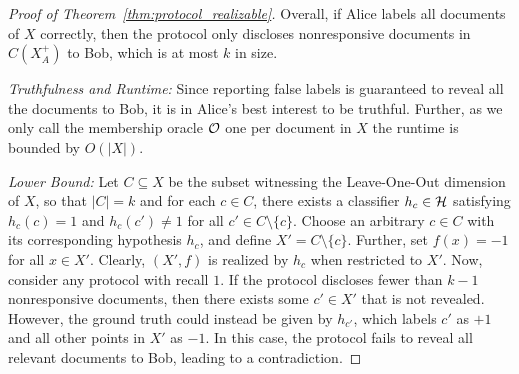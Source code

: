 \begin{proof}[Proof of Theorem~\ref{thm:protocol_realizable}]
    Overall, if Alice labels all documents of $X$ correctly, then the protocol only discloses nonresponsive documents in $C(X_A^+)$ to Bob, which is at most $k$ in size. 


    \emph{Truthfulness and Runtime:} Since reporting false labels is guaranteed to reveal all the documents to Bob, it is in Alice's best interest to be truthful. 
    Further, as we only call the membership oracle $\mathcal{O}$ one per document in $X$ the runtime is bounded by $O(|X|)$.
    
    \emph{Lower Bound:} Let $C \subseteq X$ be the subset witnessing the Leave-One-Out dimension of $X$, so that $|C| = k$ and for each $c \in C$, there exists a classifier $h_c \in \mathcal{H}$ satisfying $h_c(c) = 1$ and $h_c(c') \neq 1$ for all $c' \in C \setminus \{c\}$. 
    Choose an arbitrary $c \in C$ with its corresponding hypothesis $h_c$, and define $X' = C \setminus \{c\}$. Further, set $f(x) = -1$ for all $x \in X'$. Clearly, $(X', f)$ is realized by $h_c$ when restricted to $X'$. 
    Now, consider any protocol with recall $1$. If the protocol discloses fewer than $k-1$ nonresponsive documents, then there exists some $c' \in X'$ that is not revealed. However, the ground truth could instead be given by $h_{c'}$, which labels $c'$ as $+1$ and all other points in $X'$ as $-1$. In this case, the protocol fails to reveal all relevant documents to Bob, leading to a contradiction.
    
    

\end{proof}
